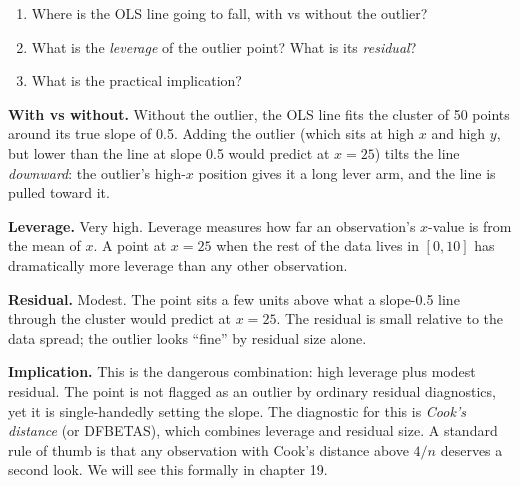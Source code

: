 \documentclass[
  letterpaper,
  11pt,
  twoside,
  openany]{scrbook}
\providecommand{\tightlist}{%
  \setlength{\itemsep}{0pt}\setlength{\parskip}{0pt}}
\begin{document}
\begin{enumerate}
\def\labelenumi{\arabic{enumi}.}
\tightlist
\item
  Where is the OLS line going to fall, with vs without the outlier?
\item
  What is the \emph{leverage} of the outlier point? What is its
  \emph{residual}?
\item
  What is the practical implication?
\end{enumerate}

\begin{tcolorbox}[enhanced jigsaw, arc=.35mm, bottomrule=.15mm, bottomtitle=1mm, breakable, colback=white, colbacktitle=quarto-callout-note-color!10!white, colframe=quarto-callout-note-color-frame, coltitle=black, left=2mm, leftrule=.75mm, opacityback=0, opacitybacktitle=0.6, rightrule=.15mm, title=\textcolor{quarto-callout-note-color}{\faInfo}\hspace{0.5em}{Solution to Problem 4}, titlerule=0mm, toprule=.15mm, toptitle=1mm]

\textbf{With vs without.} Without the outlier, the OLS line fits the
cluster of 50 points around its true slope of 0.5. Adding the outlier
(which sits at high \(x\) and high \(y\), but lower than the line at
slope 0.5 would predict at \(x = 25\)) tilts the line \emph{downward}:
the outlier's high-\(x\) position gives it a long lever arm, and the
line is pulled toward it.

\textbf{Leverage.} Very high. Leverage measures how far an observation's
\(x\)-value is from the mean of \(x\). A point at \(x = 25\) when the
rest of the data lives in \([0, 10]\) has dramatically more leverage
than any other observation.

\textbf{Residual.} Modest. The point sits a few units above what a
slope-0.5 line through the cluster would predict at \(x = 25\). The
residual is small relative to the data spread; the outlier looks
``fine'' by residual size alone.

\textbf{Implication.} This is the dangerous combination: high leverage
plus modest residual. The point is not flagged as an outlier by ordinary
residual diagnostics, yet it is single-handedly setting the slope. The
diagnostic for this is \emph{Cook's distance} (or DFBETAS), which
combines leverage and residual size. A standard rule of thumb is that
any observation with Cook's distance above \(4/n\) deserves a second
look. We will see this formally in chapter 19.

\end{tcolorbox}
\end{document}
